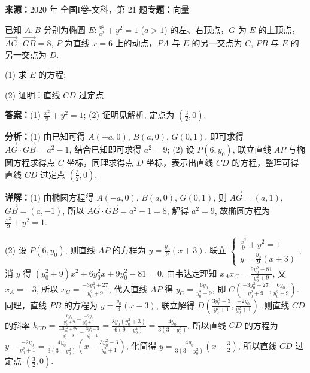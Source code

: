 \begin{question}[points=12]
\textbf{来源：}2020 年 全国I卷-文科，第 21 题\quad \textbf{专题：}向量\par
已知 $A, B$ 分别为椭圆 $E: \frac{x^2}{a^2} + y^2 = 1$ ($a>1$) 的左、右顶点，$G$ 为 $E$ 的上顶点，$\overrightarrow{AG} \cdot \overrightarrow{GB} = 8$, $P$ 为直线 $x=6$ 上的动点，$PA$ 与 $E$ 的另一交点为 $C$, $PB$ 与 $E$ 的另一交点为 $D$.



(1) 求 $E$ 的方程;



(2) 证明：直线 $CD$ 过定点.
\begin{solution}
\textbf{答案：}(1) $\frac{x^2}{9} + y^2 = 1$; (2) 证明见解析, 定点为 $\left(\frac{3}{2}, 0\right)$.

\textbf{分析：}(1) 由已知可得 $A(-a,0)$, $B(a,0)$, $G(0,1)$, 即可求得 $\overrightarrow{AG}\cdot\overrightarrow{GB}=a^2-1$, 结合已知即可求得 $a^2=9$; (2) 设 $P(6,y_0)$, 联立直线 $AP$ 与椭圆方程求得点 $C$ 坐标，同理求得点 $D$ 坐标，表示出直线 $CD$ 的方程，整理可得直线 $CD$ 过定点 $\left(\frac{3}{2},0\right)$.

\textbf{详解：}(1) 由椭圆方程得 $A(-a,0)$, $B(a,0)$, $G(0,1)$, 则 $\overrightarrow{AG}=(a,1)$, $\overrightarrow{GB}=(a,-1)$, 所以 $\overrightarrow{AG}\cdot\overrightarrow{GB}=a^2-1=8$, 解得 $a^2=9$, 故椭圆方程为 $\frac{x^2}{9}+y^2=1$.

(2) 设 $P(6,y_0)$, 则直线 $AP$ 的方程为 $y=\frac{y_0}{9}(x+3)$. 联立 $\begin{cases} \frac{x^2}{9}+y^2=1 \\ y=\frac{y_0}{9}(x+3) \end{cases}$, 消 $y$ 得 $(y_0^2+9)x^2+6y_0^2x+9y_0^2-81=0$, 由韦达定理知 $x_A x_C = \frac{9y_0^2-81}{y_0^2+9}$, 又 $x_A=-3$, 所以 $x_C = \frac{-3y_0^2+27}{y_0^2+9}$, 代入直线 $AP$ 得 $y_C = \frac{6y_0}{y_0^2+9}$, 即 $C\left(\frac{-3y_0^2+27}{y_0^2+9}, \frac{6y_0}{y_0^2+9}\right)$. 同理，直线 $PB$ 的方程为 $y=\frac{y_0}{3}(x-3)$, 联立解得 $D\left(\frac{3y_0^2-3}{y_0^2+1}, \frac{-2y_0}{y_0^2+1}\right)$. 则直线 $CD$ 的斜率 $k_{CD} = \frac{\frac{6y_0}{y_0^2+9} - \frac{-2y_0}{y_0^2+1}}{\frac{-3y_0^2+27}{y_0^2+9} - \frac{3y_0^2-3}{y_0^2+1}} = \frac{8y_0(y_0^2+3)}{6(9-y_0^4)} = \frac{4y_0}{3(3-y_0^2)}$, 所以直线 $CD$ 的方程为 $y - \frac{-2y_0}{y_0^2+1} = \frac{4y_0}{3(3-y_0^2)}\left(x - \frac{3y_0^2-3}{y_0^2+1}\right)$, 化简得 $y = \frac{4y_0}{3(3-y_0^2)}\left(x - \frac{3}{2}\right)$, 所以直线 $CD$ 过定点 $\left(\frac{3}{2},0\right)$.
\end{solution}
\end{question}

